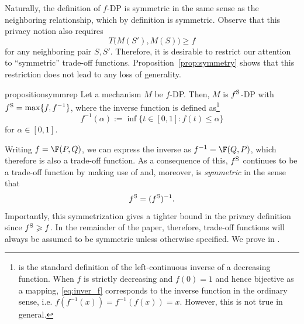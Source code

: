Naturally, the definition of $f$-DP is symmetric in the same sense as the neighboring relationship, which by definition is symmetric. Observe that this privacy notion also requires
\[
T\big(M(S'), M(S)\big) \ge f
\]
for any neighboring pair $S, S'$. Therefore, it is desirable to restrict our attention to ``symmetric'' trade-off functions. Proposition~\ref{prop:symmetry} shows that this restriction does not lead to any loss of generality.
\begin{restatable}{proposition}{symmrep}\label{prop:symmetry}
Let a mechanism $M$ be $f$-DP. Then, $M$ is $f^{\mathrm{S}}$-DP with $f^{\mathrm{S}} = \max\{f, f^{-1}\}$, where the inverse function is defined as\footnote{
 is the standard definition of the left-continuous inverse of a decreasing function. When $f$ is strictly decreasing and $f(0)=1$ and hence bijective as a mapping, \eqref{eq:inver_f} corresponds to the inverse function in the ordinary sense, i.e. $f(f^{-1}(x)) = f^{-1}(f(x)) = x$. However, this is not true in general.}
\begin{equation}\label{eq:inver_f}
f^{-1}(\alpha):=\inf\{t \in [0,1]:f(t) \leqslant \alpha\}
\end{equation}
for $\alpha \in[0,1]$.
\end{restatable}

Writing $f = \F(P,Q)$, we can express the inverse as $f^{-1} = \F(Q, P)$, which therefore is also a trade-off function. As a consequence of this, $f^{\mathrm{S}}$ continues to be a trade-off function by making use of  and, moreover, is \textit{symmetric} in the sense that 
\[
f^{\mathrm{S}} = (f^{\mathrm{S}})^{-1}.
\] 
Importantly, this symmetrization gives a tighter bound in the privacy definition since $f^{\mathrm{S}} \geqslant f$. In the remainder of the paper, therefore, trade-off functions will always be assumed to be symmetric unless otherwise specified. We prove  in .


